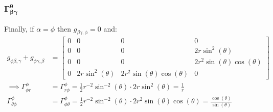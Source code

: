 \documentclass[a4paper]{article}
\begin{document}
\subsubsection{$\boldsymbol{\Gamma^\theta_{\beta \gamma}}$}
Finally, if $\alpha = \phi$ then $g_{\beta\gamma,\phi} = 0$ and:
\begin{align*}
	g_{\phi\beta , \gamma} + g_{\phi \gamma , \beta} &= \begin{bmatrix} 0 & 0 & 0 & 0 \\
		0 & 0 & 0 & 2r\sin^2(\theta)\\
		0 & 0 & 0 & 2r^2 \sin(\theta)\cos(\theta) \\
		0 & 2r\sin^2(\theta) & 2r^2 \sin(\theta)\cos(\theta) & 0
\end{bmatrix}\\
\implies \Gamma^\phi_{\phi r} &= \Gamma^\phi_{r \phi} = \frac{1}{2} r^{-2}\sin^{-2}(\theta) \cdot 2r \sin^2(\theta) =  \frac{1}{r}\\
\Gamma^\phi_{\theta \phi} &= \Gamma^\phi_{\phi \theta} = \frac{1}{2}r^{-2}\sin^{-2}(\theta) \cdot 2r^2\sin(\theta)\cos(\theta) = \frac{ \cos(\theta)}{\sin(\theta)}
\end{align*}
\end{document}
